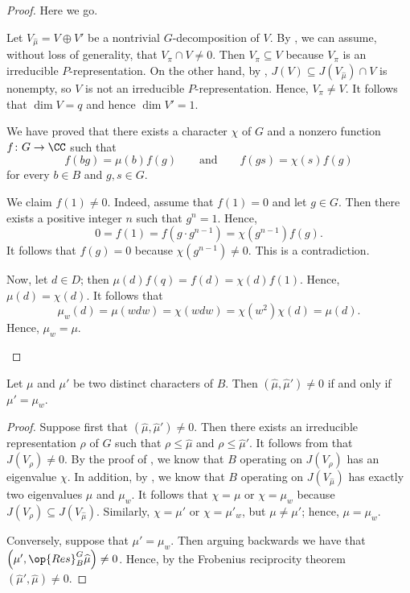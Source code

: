 \documentclass[../main.tex]{subfiles}
\begin{document}
\begin{proof}
	Here we go.
	\begin{listalph}
		\item Let $V_{\widehat\mu}=V\oplus V'$ be a nontrivial $G$-decomposition of $V$. By , we can assume, without loss of generality, that $V_\pi\cap V\ne0$. Then $V_\pi\subseteq V$ because $V_\pi$ is an irreducible $P$-representation. On the other hand, by , $J(V)\subseteq J(V_{\widehat\mu})\cap V$ is nonempty, so $V$ is not an irreducible $P$-representation. Hence, $V_\pi\ne V$. It follows that $\dim V=q$ and hence $\dim V'=1$.
		\item We have proved that there exists a character $\chi$ of $G$ and a nonzero function $f\colon G\to\CC$ such that
		\[f(bg)=\mu(b)f(g)\qquad\text{and}\qquad f(gs)=\chi(s)f(g)\]
		for every $b\in B$ and $g,s\in G$.
		
		We claim $f(1)\ne0$. Indeed, assume that $f(1)=0$ and let $g\in G$. Then there exists a positive integer $n$ such that $g^n=1$. Hence,
		\[0=f(1)=f\left(g\cdot g^{n-1}\right)=\chi\left(g^{n-1}\right)f(g).\]
		It follows that $f(g)=0$ because $\chi\left(g^{n-1}\right)\ne0$. This is a contradiction.

		Now, let $d\in D$; then $\mu(d)f(q)=f(d)=\chi(d)f(1)$. Hence, $\mu(d)=\chi(d)$. It follows that
		\[\mu_w(d)=\mu(wdw)=\chi(wdw)=\chi\left(w^2\right)\chi(d)=\mu(d).\]
		Hence, $\mu_w=\mu$.
		\qedhere
	\end{listalph}
\end{proof}
\begin{lemma} \label{lem:mu-hat-interference}
	Let $\mu$ and $\mu'$ be two distinct characters of $B$. Then $\left(\widehat\mu,\widehat\mu'\right)\ne0$ if and only if $\mu'=\mu_w$.
\end{lemma}
\begin{proof}
	Suppose first that $\left(\widehat\mu,\widehat\mu'\right)\ne0$. Then there exists an irreducible representation $\rho$ of $G$ such that $\rho\le\widehat\mu$ and $\rho\le\widehat\mu'$. It follows from  that $J(V_\rho)\ne0$. By the proof of , we know that $B$ operating on $J(V_\rho)$ has an eigenvalue $\chi$. In addition, by , we know that $B$ operating on $J(V_{\widehat\mu})$ has exactly two eigenvalues $\mu$ and $\mu_w$. It follows that $\chi=\mu$ or $\chi=\mu_w$ because $J(V_\rho)\subseteq J(V_{\widehat\mu})$. Similarly, $\chi=\mu'$ or $\chi=\mu'_w$, but $\mu\ne\mu'$; hence, $\mu=\mu_w$.

	Conversely, suppose that $\mu'=\mu_w$. Then arguing backwards we have that $\left(\mu',\op{Res}^G_B\widehat\mu\right)\ne0$. Hence, by the Frobenius reciprocity theorem $\left(\widehat\mu',\widehat\mu\right)\ne0$.
\end{proof}
\end{document}
